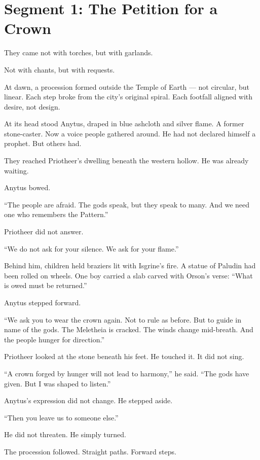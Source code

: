 \documentclass[10pt]{article}
\begin{document}
\newpage

\section*{Segment 1: The Petition for a Crown}

They came not with torches, but with garlands.

Not with chants, but with requests.

At dawn, a procession formed outside the Temple of Earth —  
not circular, but linear.  
Each step broke from the city's original spiral.  
Each footfall aligned with desire, not design.

At its head stood Anytus, draped in blue ashcloth and silver flame.  
A former stone-caster. Now a voice people gathered around.  
He had not declared himself a prophet.  
But others had.

They reached Priotheer's dwelling beneath the western hollow.  
He was already waiting.

Anytus bowed.

 “The people are afraid.  
 The gods speak, but they speak to many.  
 And we need one who remembers the Pattern.”

Priotheer did not answer.

 “We do not ask for your silence.  
 We ask for your flame.”

Behind him, children held braziers lit with Isgrine’s fire.  
A statue of Paludin had been rolled on wheels.  
One boy carried a slab carved with Orson’s verse:  
 “What is owed must be returned.”

Anytus stepped forward.

 “We ask you to wear the crown again.  
 Not to rule as before.  
 But to guide in name of the gods.  
 The Meletheia is cracked.  
 The winds change mid-breath.  
 And the people hunger for direction.”

Priotheer looked at the stone beneath his feet.  
He touched it.  
It did not sing.

 “A crown forged by hunger will not lead to harmony,” he said.  
 “The gods have given.  
 But I was shaped to listen.”

Anytus’s expression did not change.  
He stepped aside.

 “Then you leave us to someone else.”

He did not threaten.  
He simply turned.

The procession followed.  
Straight paths. Forward steps.
\end{document}
